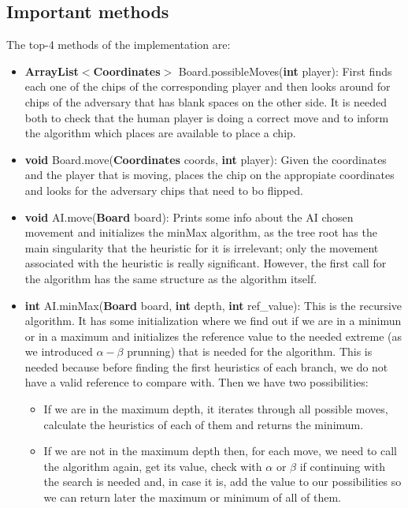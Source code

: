 \documentclass[]{report}
\begin{document}
	\subsection*{Important methods}
		The top-4 methods of the implementation are:
		\begin{itemize}
			\item \textbf{ArrayList$<$Coordinates$>$} Board.possibleMoves(\textbf{int} player): First finds each one of the chips of the corresponding player and then looks around for chips of the adversary that has blank spaces on the other side. It is needed both to check that the human player is doing a correct move and to inform the algorithm which places are available to place a chip.
			\item \textbf{void} Board.move(\textbf{Coordinates} coords, \textbf{int} player): Given the coordinates and the player that is moving, places the chip on the appropiate coordinates and looks for the adversary chips that need to bo flipped.
			\item \textbf{void} AI.move(\textbf{Board} board): Prints some info about the AI chosen movement and initializes the minMax algorithm, as the tree root has the main singularity that the heuristic for it is irrelevant; only the movement associated with the heuristic is really significant. However, the first call for the algorithm has the same structure as the algorithm itself.
\newpage			
			\item \textbf{int} AI.minMax(\textbf{Board} board,  \textbf{int} depth, \textbf{int} ref\_value): This is the recursive algorithm. It has some initialization where we find out if we are in a minimun or in a maximum and initializes the reference value to the needed extreme (as we introduced $\alpha-\beta$ prunning) that is needed for the algorithm. This is needed because before finding the first heuristics of each branch, we do not have a valid reference to compare with. Then we have two possibilities:
			\begin{itemize}
				\item If we are in the maximum depth, it iterates through all possible moves, calculate the heuristics of each of them and returns the minimum.
				\item If we are not in the maximum depth then, for each move, we need to call the algorithm again, get its value, check with $\alpha$ or $\beta$ if continuing with the search is needed and, in case it is, add the value to our possibilities so we can return later the maximum or minimum of all of them.

			\end{itemize}
		\end{itemize}
\end{document}
